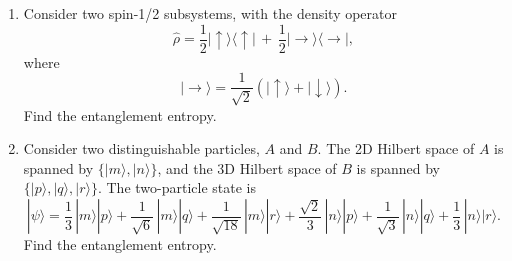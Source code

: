 \documentclass[prx,12pt]{revtex4-2}
\begin{document}
\begin{enumerate}
  

\item Consider two spin-1/2 subsystems, with the density operator
  \begin{equation}
    \hat{\rho} = \frac{1}{2} |\!\uparrow\rangle \langle\uparrow\!|
    \,+\, \frac{1}{2} |\!\rightarrow\rangle \langle\rightarrow\!|,
    \label{den}
  \end{equation}
  where
  \begin{equation}
    |\!\rightarrow\rangle = \frac{1}{\sqrt{2}} \left(|\!\uparrow\rangle +
  |\!\downarrow\rangle\right).
  \end{equation}
  Find the entanglement entropy.
  \label{ex:rho_decomp}

\item 
  Consider two distinguishable particles, $A$ and $B$.  The 2D Hilbert
  space of $A$ is spanned by $\{|m\rangle, |n\rangle\}$, and the
  3D Hilbert space of $B$ is spanned by $\{|p\rangle, |q\rangle,
  |r\rangle\}$.  The two-particle state is
\begin{equation}
  |\psi\rangle = \frac{1}{3} \, |m\rangle|p\rangle
+ \frac{1}{\sqrt{6}} \, |m\rangle|q\rangle
+ \frac{1}{\sqrt{18}} \, |m\rangle|r\rangle
+ \frac{\sqrt{2}}{3} \, |n\rangle|p\rangle
+ \frac{1}{\sqrt{3}} \, |n\rangle|q\rangle
+ \frac{1}{3} \, |n\rangle|r\rangle.
\end{equation}
Find the entanglement entropy.

\end{enumerate}
\end{document}

